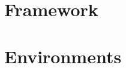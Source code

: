 \documentclass{article} %
\theoremstyle{plain} %
\theoremstyle{definition} %
\theoremstyle{remark} %
\begin{document}







\section{Framework}
\label{framework}


\section{Environments}
\end{document}
